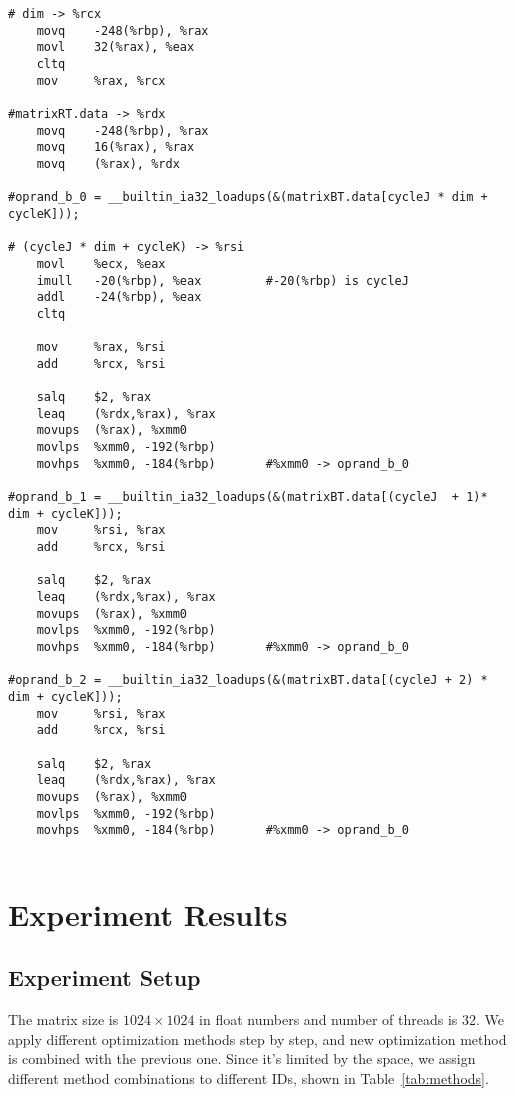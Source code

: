 \documentclass[12pt]{article}
\begin{document}
\scriptsize
\begin{verbatim}
# dim -> %rcx
	movq	-248(%rbp), %rax
	movl	32(%rax), %eax
	cltq
	mov     %rax, %rcx
  
#matrixRT.data -> %rdx
	movq	-248(%rbp), %rax
	movq	16(%rax), %rax
	movq	(%rax), %rdx

#oprand_b_0 = __builtin_ia32_loadups(&(matrixBT.data[cycleJ * dim + cycleK]));
        
# (cycleJ * dim + cycleK) -> %rsi
	movl    %ecx, %eax
	imull	-20(%rbp), %eax         #-20(%rbp) is cycleJ
	addl	-24(%rbp), %eax
	cltq
        
	mov     %rax, %rsi
	add     %rcx, %rsi
	
	salq	$2, %rax
	leaq	(%rdx,%rax), %rax
	movups	(%rax), %xmm0
	movlps	%xmm0, -192(%rbp)
	movhps	%xmm0, -184(%rbp)       #%xmm0 -> oprand_b_0

#oprand_b_1 = __builtin_ia32_loadups(&(matrixBT.data[(cycleJ  + 1)* dim + cycleK]));
	mov     %rsi, %rax
	add     %rcx, %rsi

	salq	$2, %rax
	leaq	(%rdx,%rax), %rax
	movups	(%rax), %xmm0
	movlps	%xmm0, -192(%rbp)
	movhps	%xmm0, -184(%rbp)       #%xmm0 -> oprand_b_0

#oprand_b_2 = __builtin_ia32_loadups(&(matrixBT.data[(cycleJ + 2) * dim + cycleK]));
	mov     %rsi, %rax
	add     %rcx, %rsi

	salq	$2, %rax
	leaq	(%rdx,%rax), %rax
	movups	(%rax), %xmm0
	movlps	%xmm0, -192(%rbp)
	movhps	%xmm0, -184(%rbp)       #%xmm0 -> oprand_b_0


\end{verbatim}
\normalsize


\section{Experiment Results}
\subsection{Experiment Setup}
The matrix size is $1024\times 1024$ in float numbers and number of 
threads is 32. We apply different optimization methods step by step, 
and new optimization method is combined with the previous one. Since 
it's limited by the space, we assign different method combinations to 
different IDs, shown in Table~\ref{tab:methods}.
\end{document}
